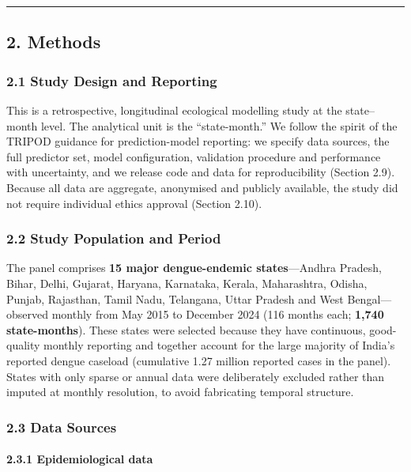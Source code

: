 \documentclass[
  10pt,
  twocolumn]{article}
\begin{document}
\begin{center}\rule{0.5\linewidth}{0.5pt}\end{center}

\subsection{2. Methods}\label{methods}

\subsubsection{2.1 Study Design and
Reporting}\label{study-design-and-reporting}

This is a retrospective, longitudinal ecological modelling study at the
state--month level. The analytical unit is the ``state-month.'' We
follow the spirit of the TRIPOD guidance for prediction-model reporting:
we specify data sources, the full predictor set, model configuration,
validation procedure and performance with uncertainty, and we release
code and data for reproducibility (Section 2.9). Because all data are
aggregate, anonymised and publicly available, the study did not require
individual ethics approval (Section 2.10).

\subsubsection{2.2 Study Population and
Period}\label{study-population-and-period}

The panel comprises \textbf{15 major dengue-endemic states}---Andhra
Pradesh, Bihar, Delhi, Gujarat, Haryana, Karnataka, Kerala, Maharashtra,
Odisha, Punjab, Rajasthan, Tamil Nadu, Telangana, Uttar Pradesh and West
Bengal---observed monthly from May 2015 to December 2024 (116 months
each; \textbf{1,740 state-months}). These states were selected because
they have continuous, good-quality monthly reporting and together
account for the large majority of India's reported dengue caseload
(cumulative 1.27 million reported cases in the panel). States with only
sparse or annual data were deliberately excluded rather than imputed at
monthly resolution, to avoid fabricating temporal structure.

\subsubsection{2.3 Data Sources}\label{data-sources}

\paragraph{2.3.1 Epidemiological data}\label{epidemiological-data}
\end{document}

